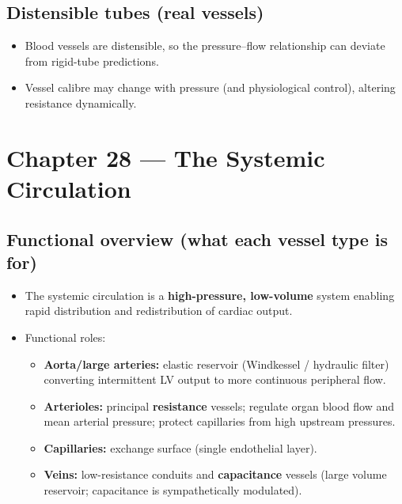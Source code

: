 \documentclass[11pt,a4paper]{article}
\begin{document}
\subsection{Distensible tubes (real vessels)}
\begin{itemize}
\item Blood vessels are distensible, so the pressure--flow relationship can deviate from rigid-tube predictions.
\item Vessel calibre may change with pressure (and physiological control), altering resistance dynamically.
\end{itemize}


\section{Chapter 28 --- The Systemic Circulation}

\subsection{Functional overview (what each vessel type is for)}
\begin{itemize}
\item The systemic circulation is a \textbf{high-pressure, low-volume} system enabling rapid distribution and redistribution of cardiac output.
\item Functional roles:
  \begin{itemize}
  \item \textbf{Aorta/large arteries:} elastic reservoir (Windkessel / hydraulic filter) converting intermittent LV output to more continuous peripheral flow.
  \item \textbf{Arterioles:} principal \textbf{resistance} vessels; regulate organ blood flow and mean arterial pressure; protect capillaries from high upstream pressures.
  \item \textbf{Capillaries:} exchange surface (single endothelial layer).
  \item \textbf{Veins:} low-resistance conduits and \textbf{capacitance} vessels (large volume reservoir; capacitance is sympathetically modulated).
  \end{itemize}
\end{itemize}
\end{document}
